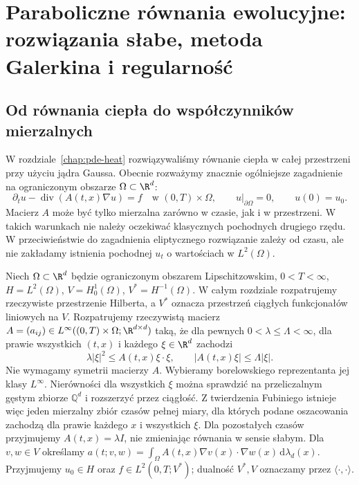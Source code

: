 \chapter[Paraboliczne równania ewolucyjne]{Paraboliczne równania ewolucyjne: rozwiązania słabe, metoda Galerkina i regularność}
\label{chap:pde20}

\section{Od równania ciepła do współczynników mierzalnych}
W rozdziale~\ref{chap:pde-heat} rozwiązywaliśmy równanie ciepła w całej przestrzeni
przy użyciu jądra Gaussa. Obecnie rozważymy znacznie ogólniejsze
zagadnienie na ograniczonym obszarze $\Omega\subset\R^d$:
\begin{equation}\label{eq:pde20-eq}
 \partial_t u-\operatorname{div}(A(t,x)\nabla u)=f
 \quad\text{w }(0,T)\times\Omega,\qquad
 u|_{\partial\Omega}=0,\qquad u(0)=u_0.
\end{equation}
Macierz $A$ może być tylko mierzalna zarówno w czasie, jak i w przestrzeni.
W takich warunkach nie należy oczekiwać klasycznych pochodnych drugiego
rzędu. W przeciwieństwie do zagadnienia eliptycznego rozwiązanie zależy
od czasu, ale nie zakładamy istnienia pochodnej $u_t$ o wartościach w $L^2(\Omega)$.

\begin{definicja}\label{def:pde20-data}
Niech $\Omega\subset\R^d$ będzie ograniczonym obszarem Lipschitzowskim,
$0<T<\infty$, $H=L^2(\Omega)$, $V=H_0^1(\Omega)$, $V^*=H^{-1}(\Omega)$.
W całym rozdziale rozpatrujemy rzeczywiste przestrzenie
Hilberta, a $V^*$ oznacza przestrzeń ciągłych
funkcjonałów liniowych na $V$.
Rozpatrujemy rzeczywistą macierz $A=(a_{ij})\in
L^\infty((0,T)\times\Omega;\R^{d\times d})$ taką, że dla pewnych
$0<\lambda\le\Lambda<\infty$, dla prawie wszystkich $(t,x)$ i każdego
$\xi\in\R^d$ zachodzi
\[
 \lambda|\xi|^2\le A(t,x)\xi\cdot\xi,
 \qquad |A(t,x)\xi|\le\Lambda|\xi|.
\]
Nie wymagamy symetrii macierzy $A$. Wybieramy
borelowskiego reprezentanta jej klasy $L^\infty$.
Nierówności dla wszystkich $\xi$ można sprawdzić
na przeliczalnym gęstym zbiorze $\mathbb{Q}^d$ i rozszerzyć
przez ciągłość. Z twierdzenia Fubiniego istnieje więc
jeden mierzalny zbiór czasów pełnej miary, dla których
podane oszacowania zachodzą dla prawie każdego $x$
i wszystkich $\xi$. Dla pozostałych czasów przyjmujemy
$A(t,x)=\lambda I$, nie zmieniając równania w sensie
słabym. Dla $v,w\in V$ określamy
$a(t;v,w)=\int_\Omega A(t,x)\nabla v(x)\cdot\nabla w(x)
\,\mathrm d\lambda_d(x)$. Przyjmujemy $u_0\in H$ oraz
$f\in L^2(0,T;V^*)$; dualność $V^*,V$ oznaczamy przez
$\langle\cdot,\cdot\rangle$.
\end{definicja}


